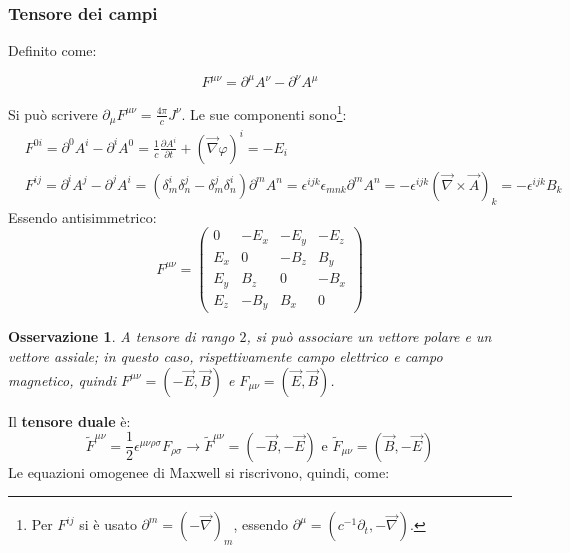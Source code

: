 \documentclass[10pt, a4paper]{scrartcl}
\numberwithin{equation}{subsection}
\theoremstyle{style1}
\newtheorem{osservazione}{Osservazione}[section]
\newenvironment{boxenv}[1][]{
    \begin{eqbox}[#1]
    }{
   \end{eqbox}
}
\begin{document}
\subsubsection{Tensore dei campi}
Definito come:
\begin{boxenv}[]
\begin{equation}
F^{\mu \nu} = \partial ^\mu  A^\nu - \partial ^\nu A^\mu  
\end{equation}
\end{boxenv}
\noindent Si pu\`o scrivere $\partial _\mu F^{\mu \nu} = \frac{4\pi }{c}J^\nu$. Le sue componenti sono\footnote{Per $F^{ij} $ si \`e usato $\partial ^m = (-\vec{\nabla })_m$, essendo $\partial ^\mu =(c^{-1} \partial _t,- \vec{\nabla })$.}:
\begin{equation*}
	\begin{split}
		&F^{0i} = \partial ^0 A^i - \partial ^i A^0 = \frac{1}{c}\frac{\partial A^i}{\partial t} + (\vec{\nabla }\varphi ) ^i = - E_i \\
		& F^{ij} = \partial ^i A^j - \partial ^j A^i = (\delta ^i_m \delta ^j_n - \delta ^j_m \delta ^i_n) \partial ^m A^n = \epsilon ^{ijk} \epsilon _{mnk} \partial ^m A^n=-\epsilon ^{ijk} (\vec{\nabla }\times \vec{A})_k = - \epsilon ^{ijk} B_k
	\end{split}
\end{equation*}
Essendo antisimmetrico:
\begin{equation}
	F^{\mu \nu} = 
	\begin{pmatrix} 
		0 & - E_x & - E_y & - E_z\\
		E_x & 0 & - B_z & B_y\\
		E_y & B_z & 0 & - B_x\\
		E_z & - B_y &B_x & 0 
	\end{pmatrix} 
\end{equation}
\begin{osservazione}
	A tensore di rango $2$, si pu\`o associare un vettore polare e un vettore assiale; in questo caso, rispettivamente campo elettrico e campo magnetico, quindi $F^{\mu \nu} =(-\vec{E},\vec{B})$ e $F_{\mu \nu}  = (\vec{E},\vec{B}) $.
\end{osservazione}
\noindent Il \textbf{tensore duale} \`e:
\begin{equation}
	\widetilde{F}^{\mu \nu} = \frac{1}{2}\epsilon ^{\mu \nu \rho  \sigma } F_{\rho \sigma } \longrightarrow \widetilde{F}^{\mu \nu} =(-\vec{B},-\vec{E}) \text{ e } \widetilde{F}_{\mu \nu} = (\vec{B},-\vec{E})
\end{equation}
Le equazioni omogenee di Maxwell si riscrivono, quindi, come:
\end{document}
